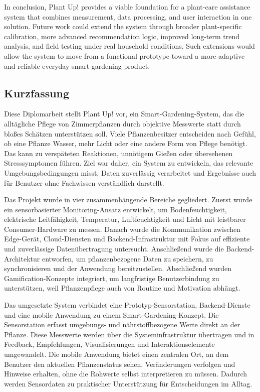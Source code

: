 In conclusion, Plant Up! provides a viable foundation for a plant-care assistance system that combines measurement, data processing, and user interaction in one solution. Future work could extend the system through broader plant-specific calibration, more advanced recommendation logic, improved long-term trend analysis, and field testing under real household conditions. Such extensions would allow the system to move from a functional prototype toward a more adaptive and reliable everyday smart-gardening product.

\clearpage
\null
\thispagestyle{empty}
\clearpage

\subsection*{Kurzfassung}

Diese Diplomarbeit stellt Plant Up! vor, ein Smart-Gardening-System, das die allt\"agliche Pflege von Zimmerpflanzen durch objektive Messwerte statt durch blo{\ss}es Sch\"atzen unterst\"utzen soll. Viele Pflanzenbesitzer entscheiden nach Gef\"uhl, ob eine Pflanze Wasser, mehr Licht oder eine andere Form von Pflege ben\"otigt. Das kann zu versp\"ateten Reaktionen, unn\"otigem Gie{\ss}en oder \"ubersehenen Stresssymptomen f\"uhren. Ziel war daher, ein System zu entwickeln, das relevante Umgebungsbedingungen misst, Daten zuverl\"assig verarbeitet und Ergebnisse auch f\"ur Benutzer ohne Fachwissen verst\"andlich darstellt.

Das Projekt wurde in vier zusammenh\"angende Bereiche gegliedert. Zuerst wurde ein sensorbasierter Monitoring-Ansatz entwickelt, um Bodenfeuchtigkeit, elektrische Leitf\"ahigkeit, Temperatur, Luftfeuchtigkeit und Licht mit leistbarer Consumer-Hardware zu messen. Danach wurde die Kommunikation zwischen Edge-Ger\"at, Cloud-Diensten und Backend-Infrastruktur mit Fokus auf effiziente und zuverl\"assige Daten\"ubertragung untersucht. Anschlie{\ss}end wurde die Backend-Architektur entworfen, um pflanzenbezogene Daten zu speichern, zu synchronisieren und der Anwendung bereitzustellen. Abschlie{\ss}end wurden Gamification-Konzepte integriert, um langfristige Benutzerbindung zu unterst\"utzen, weil Pflanzenpflege auch von Routine und Motivation abh\"angt.

Das umgesetzte System verbindet eine Prototyp-Sensorstation, Backend-Dienste und eine mobile Anwendung zu einem Smart-Gardening-Konzept. Die Sensorstation erfasst umgebungs- und n\"ahrstoffbezogene Werte direkt an der Pflanze. Diese Messwerte werden \"uber die Systeminfrastruktur \"ubertragen und in Feedback, Empfehlungen, Visualisierungen und Interaktionselemente umgewandelt. Die mobile Anwendung bietet einen zentralen Ort, an dem Benutzer den aktuellen Pflanzenstatus sehen, Ver\"anderungen verfolgen und Hinweise erhalten, ohne die Rohwerte selbst interpretieren zu m\"ussen. Dadurch werden Sensordaten zu praktischer Unterst\"utzung f\"ur Entscheidungen im Alltag.

